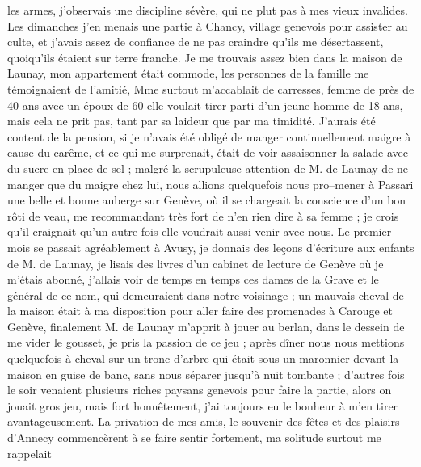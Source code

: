 \documentclass[12pt]{article}
\begin{document}
 les armes, j’observais une discipline sévère, qui ne
plut pas à mes vieux invalides. Les dimanches j’en menais une partie à Chancy, village genevois pour
assister au culte, et j’avais assez de confiance de ne pas craindre qu’ils me désertassent,
quoiqu’ils étaient sur terre franche. Je me trouvais assez bien dans la maison de Launay, mon
appartement était commode, les personnes de la famille me témoignaient de l’amitié, Mme surtout
m’accablait de carresses, femme de près de 40 ans avec un époux de 60 elle voulait tirer parti d’un
jeune homme de 18 ans, mais cela ne prit pas, tant par sa laideur que par ma timidité. J’aurais été
content de la pension, si je n’avais été obligé de manger continuellement maigre à cause du carême,
et ce qui me surprenait, était de voir assaisonner la salade avec du sucre en place de sel ; malgré
la scrupuleuse attention de M. de Launay de ne manger que du maigre chez lui, nous allions
quelquefois nous pro–mener à Passari une belle et bonne auberge sur Genève, où il se chargeait la
conscience d’un bon rôti de veau, me recommandant très fort de n’en rien dire à sa femme ; je crois
qu’il craignait qu’un autre fois elle voudrait aussi venir avec nous. Le premier mois se passait
agréablement à Avusy, je donnais des leçons d’écriture aux enfants de M. de Launay, je lisais des
livres d’un cabinet de lecture de Genève où je m’étais abonné, j’allais voir de temps en temps ces
dames de la Grave et le général de ce nom, qui demeuraient dans notre voisinage ; un mauvais cheval
de la maison était à ma disposition pour aller faire des promenades à Carouge et Genève, finalement
M. de Launay m’apprit à jouer au berlan, dans le dessein de me vider le gousset, je pris la passion
de ce jeu ; après dîner nous nous mettions quelquefois à cheval sur un tronc d’arbre qui était sous
un maronnier devant la maison en guise de banc, sans nous séparer jusqu’à nuit tombante ; d’autres
fois le soir venaient plusieurs riches paysans genevois pour faire la partie, alors on jouait gros
jeu, mais fort honnêtement, j’ai toujours eu le bonheur à m’en tirer avantageusement. La privation
de mes amis, le souvenir des fêtes et des plaisirs d’Annecy commencèrent à se faire sentir
fortement, ma solitude surtout me rappelait
\end{document}
